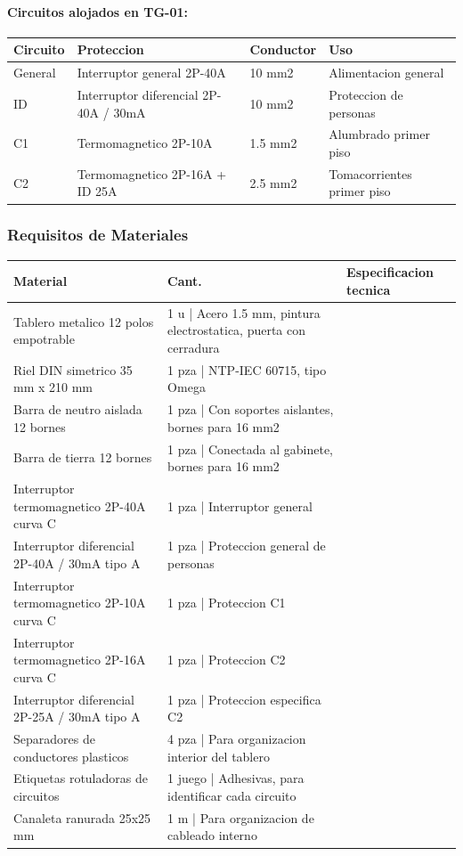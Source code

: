 \paragraph{Circuitos alojados en TG-01:}
\begin{longtable}{L{2.5cm} L{5.0cm} L{3.0cm} L{3.5cm}}
\toprule
\textbf{Circuito} & \textbf{Proteccion} & \textbf{Conductor} & \textbf{Uso} \\
\midrule
General & Interruptor general 2P-40A & 10 mm2 & Alimentacion general \\
ID & Interruptor diferencial 2P-40A / 30mA & 10 mm2 & Proteccion de personas \\
C1 & Termomagnetico 2P-10A & 1.5 mm2 & Alumbrado primer piso \\
C2 & Termomagnetico 2P-16A + ID 25A & 2.5 mm2 & Tomacorrientes primer piso \\
\bottomrule
\end{longtable}

\subsubsection{Requisitos de Materiales}

\begin{longtable}{L{5.0cm} L{2.0cm} L{7.5cm}}
\toprule
\textbf{Material} & \textbf{Cant.} & \textbf{Especificacion tecnica} \\
\midrule
Tablero metalico 12 polos empotrable & 1 u | Acero 1.5 mm, pintura electrostatica, puerta con cerradura \\
Riel DIN simetrico 35 mm x 210 mm & 1 pza | NTP-IEC 60715, tipo Omega \\
Barra de neutro aislada 12 bornes & 1 pza | Con soportes aislantes, bornes para 16 mm2 \\
Barra de tierra 12 bornes & 1 pza | Conectada al gabinete, bornes para 16 mm2 \\
Interruptor termomagnetico 2P-40A curva C & 1 pza | Interruptor general \\
Interruptor diferencial 2P-40A / 30mA tipo A & 1 pza | Proteccion general de personas \\
Interruptor termomagnetico 2P-10A curva C & 1 pza | Proteccion C1 \\
Interruptor termomagnetico 2P-16A curva C & 1 pza | Proteccion C2 \\
Interruptor diferencial 2P-25A / 30mA tipo A & 1 pza | Proteccion especifica C2 \\
Separadores de conductores plasticos & 4 pza | Para organizacion interior del tablero \\
Etiquetas rotuladoras de circuitos & 1 juego | Adhesivas, para identificar cada circuito \\
Canaleta ranurada 25x25 mm & 1 m | Para organizacion de cableado interno \\
\bottomrule
\end{longtable}

